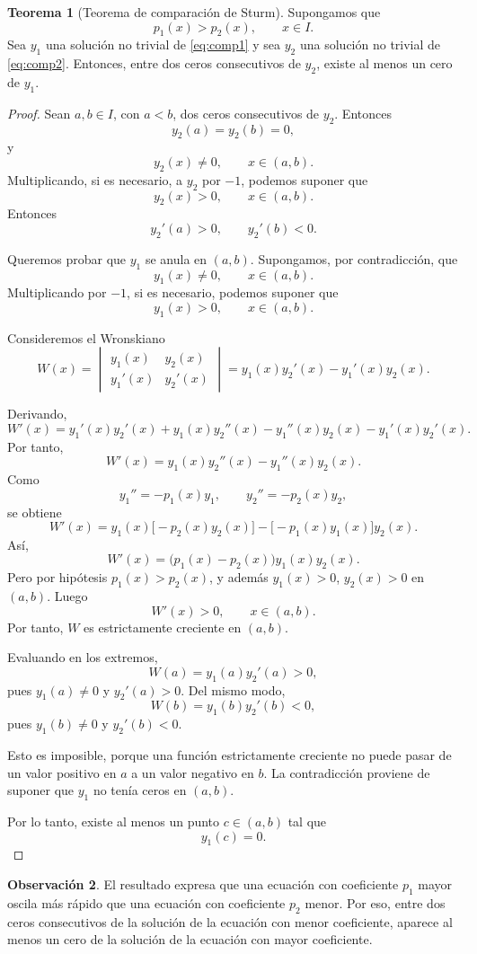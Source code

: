 \documentclass[12pt,a4paper]{article}
\theoremstyle{definition}
\newtheorem{teorema}{Teorema}[section]
\newtheorem{observacion}[teorema]{Observación}
\begin{document}
\begin{teorema}[Teorema de comparación de Sturm]
Supongamos que
\[
p_1(x)>p_2(x),\qquad x\in I.
\]
Sea \(y_1\) una solución no trivial de \eqref{eq:comp1} y sea \(y_2\) una solución no trivial de \eqref{eq:comp2}. Entonces, entre dos ceros consecutivos de \(y_2\), existe al menos un cero de \(y_1\).
\end{teorema}

\begin{proof}
Sean \(a,b\in I\), con \(a<b\), dos ceros consecutivos de \(y_2\). Entonces
\[
y_2(a)=y_2(b)=0,
\]
y
\[
y_2(x)\neq 0,\qquad x\in(a,b).
\]
Multiplicando, si es necesario, a \(y_2\) por \(-1\), podemos suponer que
\[
y_2(x)>0,\qquad x\in(a,b).
\]
Entonces
\[
y_2'(a)>0,\qquad y_2'(b)<0.
\]

Queremos probar que \(y_1\) se anula en \((a,b)\). Supongamos, por contradicción, que
\[
y_1(x)\neq 0,\qquad x\in(a,b).
\]
Multiplicando por \(-1\), si es necesario, podemos suponer que
\[
y_1(x)>0,\qquad x\in(a,b).
\]

Consideremos el Wronskiano
\[
W(x)=
\begin{vmatrix}
y_1(x) & y_2(x)\\
y_1'(x) & y_2'(x)
\end{vmatrix}
=
y_1(x)y_2'(x)-y_1'(x)y_2(x).
\]

Derivando,
\[
W'(x)
=
y_1'(x)y_2'(x)+y_1(x)y_2''(x)
-y_1''(x)y_2(x)-y_1'(x)y_2'(x).
\]
Por tanto,
\[
W'(x)=y_1(x)y_2''(x)-y_1''(x)y_2(x).
\]
Como
\[
y_1''=-p_1(x)y_1,
\qquad
y_2''=-p_2(x)y_2,
\]
se obtiene
\[
W'(x)
=
y_1(x)\bigl[-p_2(x)y_2(x)\bigr]
-
\bigl[-p_1(x)y_1(x)\bigr]y_2(x).
\]
Así,
\[
W'(x)=\bigl(p_1(x)-p_2(x)\bigr)y_1(x)y_2(x).
\]
Pero por hipótesis \(p_1(x)>p_2(x)\), y además \(y_1(x)>0\), \(y_2(x)>0\) en \((a,b)\). Luego
\[
W'(x)>0,\qquad x\in(a,b).
\]
Por tanto, \(W\) es estrictamente creciente en \((a,b)\).

Evaluando en los extremos,
\[
W(a)=y_1(a)y_2'(a)>0,
\]
pues \(y_1(a)\neq 0\) y \(y_2'(a)>0\). Del mismo modo,
\[
W(b)=y_1(b)y_2'(b)<0,
\]
pues \(y_1(b)\neq 0\) y \(y_2'(b)<0\).

Esto es imposible, porque una función estrictamente creciente no puede pasar de un valor positivo en \(a\) a un valor negativo en \(b\). La contradicción proviene de suponer que \(y_1\) no tenía ceros en \((a,b)\).

Por lo tanto, existe al menos un punto \(c\in(a,b)\) tal que
\[
y_1(c)=0.
\]
\end{proof}

\begin{observacion}
El resultado expresa que una ecuación con coeficiente \(p_1\) mayor oscila más rápido que una ecuación con coeficiente \(p_2\) menor. Por eso, entre dos ceros consecutivos de la solución de la ecuación con menor coeficiente, aparece al menos un cero de la solución de la ecuación con mayor coeficiente.
\end{observacion}
\end{document}

